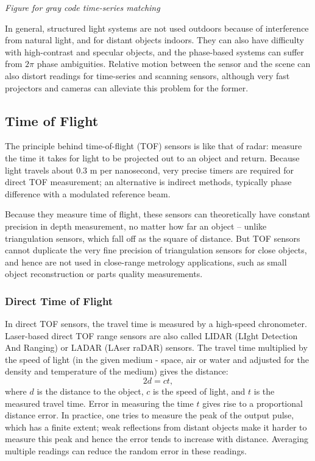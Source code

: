 \documentclass[twocolumn,oneside]{book}
\begin{document}
{\em Figure for gray code time-series matching}

In general, structured light systems are not used outdoors because of
interference from natural light, and for distant objects indoors.
They can also have difficulty with high-contrast and specular objects,
and the phase-based systems can suffer from $2\pi$ phase ambiguities.
Relative motion between the sensor and the scene can also distort
readings for time-series and scanning sensors, although very fast
projectors and cameras can alleviate this problem for the former.

\subsection{Time of Flight}

The principle behind time-of-flight (TOF) sensors is like that of
radar: measure the time it takes for light to be projected out to an
object and return.  Because light travels about 0.3 m per nanosecond,
very precise timers are required for direct TOF measurement; an
alternative is indirect methods, typically phase difference with a
modulated reference beam.

Because they measure time of flight, these sensors can theoretically
have constant precision in depth measurement, no matter how far an
object -- unlike triangulation sensors, which fall off as the square of
distance.  But TOF sensors cannot duplicate the very fine precision of
triangulation sensors for close objects, and hence are not used in
close-range metrology applications, such as small object
reconstruction or parts quality measurements.

\subsubsection{Direct Time of Flight}


In direct TOF sensors, the travel time is measured by a high-speed
chronometer.  Laser-based direct TOF range sensors are also called
LIDAR (LIght Detection And Ranging) or LADAR (LAser raDAR) sensors.
The travel time multiplied by the speed of light (in the given medium
- space, air or water and adjusted for the density and temperature of
the medium) gives the distance:
\begin{equation}
  2d = ct,
\end{equation}
where $d$ is the distance to the object, $c$ is the speed of light,
and $t$ is the measured travel time.  Error in measuring the time $t$
gives rise to a proportional distance error.  In practice, one tries
to measure the peak of the output pulse, which has a finite extent;
weak reflections from distant objects make it harder to measure this
peak and hence the error tends to increase with distance.  Averaging
multiple readings can reduce the random error in these readings.
\end{document}
